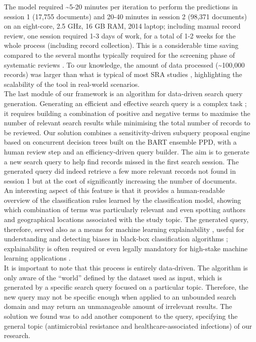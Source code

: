 \documentclass[]{bmcart}
\begin{document}
The model required \textasciitilde5-20 minutes per iteration to perform
the predictions in session 1 (17,755 documents) and 20-40 minutes in
session 2 (98,371 documents) on an eight-core, 2.5 GHz, 16 GB RAM, 2014
laptop; including manual record review, one session required 1-3 days of
work, for a total of 1-2 weeks for the whole process (including record
collection). This is a considerable time saving compared to the several
months typically required for the screening phase of systematic reviews
\citep{bannach2019machine, borah2017analysis, allen1999estimating}. To
our knowledge, the amount of data processed (\textasciitilde100,000
records) was larger than what is typical of most SRA studies
\citep{o2015using, olorisade2016critical}, highlighting the scalability
of the tool in real-world scenarios.\\

The last module of our framework is an algorithm for data-driven search
query generation. Generating an efficient and effective search query is
a complex task \citep{lefebvre2011searching, hammerstrom2010searching};
it requires building a combination of positive and negative terms to
maximise the number of relevant search results while minimising the
total number of records to be reviewed. Our solution combines a
sensitivity-driven subquery proposal engine based on concurrent decision
trees \citep{blanco2019machine, moore2018transparent} built on the BART
ensemble PPD, with a human review step and an efficiency-driven query
builder. The aim is to generate a new search query to help find records
missed in the first search session. The generated query did indeed
retrieve a few more relevant records not found in session 1 but at the
cost of significantly increasing the number of documents.\\
An interesting aspect of this feature is that it provides a
human-readable overview of the classification rules learned by the
classification model, showing which combination of terms was
particularly relevant and even spotting authors and geographical
locations associated with the study topic. The generated query,
therefore, served also as a means for machine learning explainability
\citep{bhatt2020machine, burkart2021survey}, useful for understanding
and detecting biases in black-box classification algorithms
\citep{malhi2020explainable}; explainability is often required or even
legally mandatory for high-stake machine learning applications
\citep{bibal2021legal, bibal2020impact}.\\
It is important to note that this process is entirely data-driven. The
algorithm is only aware of the ``world'' defined by the dataset used as
input, which is generated by a specific search query focused on a
particular topic. Therefore, the new query may not be specific enough
when applied to an unbounded search domain and may return an
unmanageable amount of irrelevant results. The solution we found was to
add another component to the query, specifying the general topic
(antimicrobial resistance and healthcare-associated infections) of our
research.\\
\end{document}

